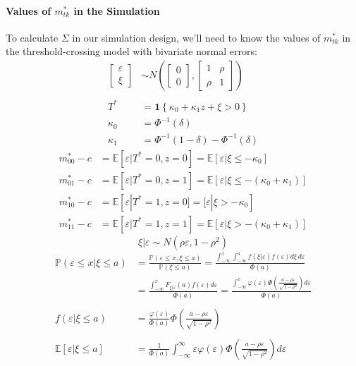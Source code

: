 \documentclass[12pt]{article}
\begin{document}
\paragraph{Values of $m^*_{tk}$ in the Simulation}
To calculate $\Sigma$ in our simulation design, we'll need to know the values of $m_{tk}^*$ in the threshold-crossing model with bivariate normal errors:
\begin{align*}
  \left[
  \begin{array}{c}
    \varepsilon \\ \xi
  \end{array}
  \right] &\sim N\left( \left[
  \begin{array}{c}
    0 \\ 0
  \end{array}
\right], \left[
\begin{array}{cc}
  1 & \rho \\
  \rho & 1
\end{array}
\right]\right)\\ \\
  T^* &= \mathbf{1}\left\{ \kappa_0 + \kappa_1 z + \xi > 0 \right\}\\
  \kappa_0 &= \Phi^{-1}(\delta)\\
  \kappa_1 &= \Phi^{-1}(1-\delta) - \Phi^{-1}(\delta)
\end{align*}
\begin{align*}
  m_{00}^* - c &= \mathbb{E}[\varepsilon|T^*=0,z=0] = \mathbb{E}[\varepsilon|\xi \leq -\kappa_0]\\
  m_{01}^* - c &= \mathbb{E}[\varepsilon|T^*=0,z=1] = \mathbb{E}[\varepsilon|\xi\leq -(\kappa_0 + \kappa_1)]\\
  m_{10}^* - c &= \mathbb{E}[\varepsilon|T^*=1,z=0] = \mathbb[\varepsilon|\xi > -\kappa_0]\\
  m_{11}^* - c &= \mathbb{E}[\varepsilon|T^*=1,z=1] = \mathbb{E}[\varepsilon|\xi > -(\kappa_0 + \kappa_1)]
\end{align*}
\[
  \xi|\varepsilon \sim N(\rho \varepsilon, 1 - \rho^2)
\]
\begin{align*}
\mathbb{P}(\varepsilon \leq x|\xi \leq a) &= \frac{\mathbb{P}(\varepsilon \leq x,\xi \leq a)}{\mathbb{P}(\xi \leq a)} = \frac{\int_{-\infty}^x \int_{-\infty}^a f(\xi|\varepsilon)f(\varepsilon) d \xi \, d \varepsilon }{\Phi(a)}\\
&=\frac{\int_{-\infty}^x F_{\xi|\varepsilon}(a)f(\varepsilon) d\varepsilon}{\Phi(a)} = \frac{\displaystyle\int_{-\infty}^x \varphi(\varepsilon)\Phi\left( \frac{a - \rho \varepsilon}{\sqrt{1 - \rho^2}} \right)d\varepsilon }{\Phi(a)} \\ \\
  f(\varepsilon|\xi\leq a) &= \frac{\varphi(\varepsilon)}{\Phi(a)}\Phi\left( \frac{a - \rho \varepsilon}{\sqrt{1 - \rho^2}} \right) \\ \\
  \mathbb{E}\left[ \varepsilon|\xi \leq a \right] & = \frac{1}{\Phi(a)} \int_{-\infty}^\infty \varepsilon \varphi(\varepsilon) \Phi\left( \frac{a - \rho \varepsilon}{\sqrt{1 - \rho^2}} \right) d\varepsilon
\end{align*}
\end{document}
